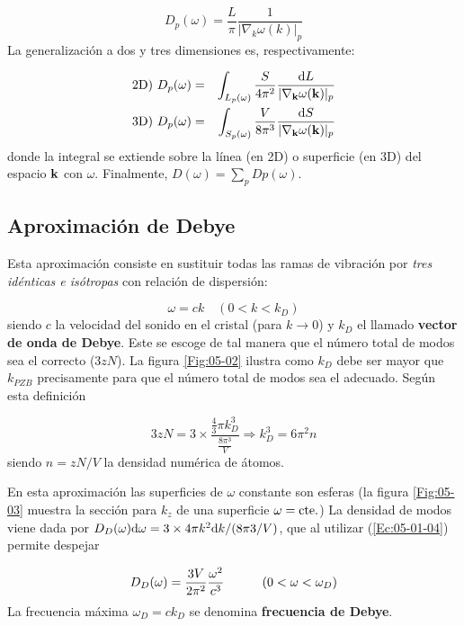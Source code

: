 \begin{equation}
	D_p (\omega)  = \frac{L}{\pi} \frac{1}{|\nabla_ k \omega (k)|_p }
\end{equation}
La generalización a dos y tres dimensiones es, respectivamente:

\begin{eqnarray}
	\text{2D}) \  D_p (\omega) &=& \int_{L_p (\omega)} \frac{S}{4\pi^2} \frac{\mathrm{d} L}{|\nabla_{\mathbf{k}} \omega(\mathbf{k})|_p} \\ 
	\text{3D}) \  D_p (\omega) &=& \int_{S_p (\omega)} \frac{V}{8\pi^3} \frac{\mathrm{d} S}{|\nabla_{\mathbf{k}} \omega(\mathbf{k})|_p} \label{Ec:05-01-04}
\end{eqnarray}
donde la integral se extiende sobre la línea (en 2D) o superficie (en 3D) del espacio $\mathbf{k}$ con $\omega$. Finalmente, $D(\omega)=\sum_p Dp (\omega)$.
 
\subsection{Aproximación de Debye}    

Esta aproximación consiste en sustituir todas las ramas de vibración por \textit{tres idénticas e isótropas} con relación de dispersión:

\begin{equation}
	\omega = c k \quad (0<k<k_D)
\end{equation}
siendo $c$ la velocidad del sonido en el cristal (para $k\rightarrow 0$) y $k_D$ el llamado \textbf{vector de onda de Debye}. Este se escoge de tal manera que el número total de modos sea el correcto ($3zN$). La figura \ref{Fig:05-02} ilustra como $k_D$ debe ser mayor que $k_{PZB}$ precisamente para que el número total de modos sea el adecuado. Según esta definición

\begin{equation}
	3zN = 3 \times \frac{\frac{4}{3} \pi k^3_D}{\frac{8 \pi^3}{V}} \Rightarrow k_D^3 = 6 \pi^2 n
\end{equation}
siendo $n=zN/V$ la densidad numérica de átomos. 

En esta aproximación las superficies de $\omega$ constante son esferas (la figura \ref{Fig:05-03} muestra la sección para $k_z$ de una superficie $\omega=\text{cte}.$) La densidad de modos viene dada por $D_D(\omega) \mathrm{d} \omega = 3 \times 4 \pi k^2 \mathrm{d} k / (8\pi3 /V)$, que al utilizar (\ref{Ec:05-01-04}) permite despejar 

\begin{equation}
	D_D (\omega) = \frac{3V}{2\pi^2} \frac{\omega^2}{c^3} \quad \quad \quad (0<\omega<\omega_D)
    \label{Ec:05-01-07}
\end{equation}
La frecuencia máxima $\omega_D=ck_D$ se denomina \textbf{frecuencia de Debye}. 


